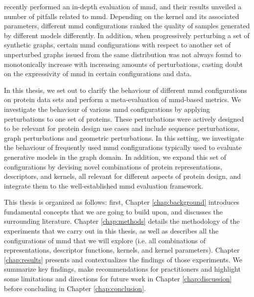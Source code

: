 \cite{obray2022evaluation} recently performed an in-depth evaluation of
\acrshort{mmd}, and their results unveiled a number of pitfalls related to
\acrshort{mmd}. Depending on the kernel and its associated parameters,
different \acrshort{mmd} configurations ranked the quality of samples generated
by different models differently. In addition, when progressively perturbing a
set of synthetic graphs, certain \acrshort{mmd} configurations with respect to
another set of unperturbed graphs issued from the same distribution was not
always found to monotonically increase with increasing amounts of perturbations,
casting doubt on the expressivity of \acrshort{mmd} in certain configurations
and data.

In this thesis, we set out to clarify the behaviour of different \acrshort{mmd}
configurations on protein data sets and perform a meta-evaluation of
\acrshort{mmd}-based metrics. We investigate the behaviour of various
\acrshort{mmd} configurations by applying perturbations to one set of proteins.
These perturbations were actively designed to be relevant for protein design use
cases and include sequence perturbations, graph perturbations and geometric
perturbations. In this setting, we investigate the behaviour of frequently used
\acrshort{mmd} configurations typically used to evaluate generative models in
the graph domain. In addition, we expand this set of configurations by devising
novel combinations of protein representations, descriptors, and kernels, all
relevant for different aspects of protein design, and integrate them to the
well-established \acrshort{mmd} evaluation framework.

This thesis is organized as follows: first, Chapter \ref{chap:background}
introduces fundamental concepts that we are going to build upon, and discusses
the surrounding literature. Chapter \ref{chap:methods} details the methodology
of the experiments that we carry out in this thesis, as well as
describes all the configurations of \acrshort{mmd} that we will explore (i.e. all
combinations of representations, descriptor functions, kernels, and kernel
parameters). Chapter \ref{chap:results} presents and contextualizes the findings of those
experiments. We summarize key findings, make recommendations for practitioners and
highlight some limitations and directions for future work in Chapter
\ref{chap:discussion} before concluding in Chapter \ref{chap:conclusion}.





